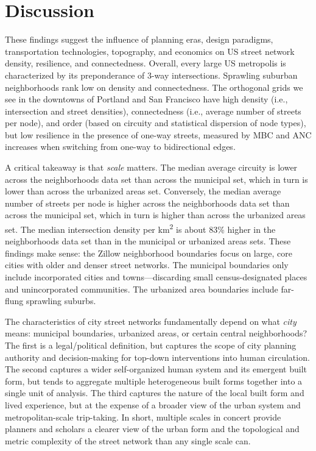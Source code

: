 \documentclass[Afour,sageh,times]{sagej}
\begin{document}
\section{Discussion}

These findings suggest the influence of planning eras, design paradigms, transportation technologies, topography, and economics on US street network density, resilience, and connectedness. Overall, every large US metropolis is characterized by its preponderance of 3-way intersections. Sprawling suburban neighborhoods rank low on density and connectedness. The orthogonal grids we see in the downtowns of Portland and San Francisco have high density (i.e., intersection and street densities), connectedness (i.e., average number of streets per node), and order (based on circuity and statistical dispersion of node types), but low resilience in the presence of one-way streets, measured by MBC and ANC increases when switching from one-way to bidirectional edges.

A critical takeaway is that \emph{scale} matters. The median average circuity is lower across the neighborhoods data set than across the municipal set, which in turn is lower than across the urbanized areas set. Conversely, the median average number of streets per node is higher across the neighborhoods data set than across the municipal set, which in turn is higher than across the urbanized areas set. The median intersection density per km\textsuperscript{2} is about 83\% higher in the neighborhoods data set than in the municipal or urbanized areas sets. These findings make sense: the Zillow neighborhood boundaries focus on large, core cities with older and denser street networks. The municipal boundaries only include incorporated cities and towns---discarding small census-designated places and unincorporated communities. The urbanized area boundaries include far-flung sprawling suburbs.

The characteristics of city street networks fundamentally depend on what \emph{city} means: municipal boundaries, urbanized areas, or certain central neighborhoods? The first is a legal/political definition, but captures the scope of city planning authority and decision-making for top-down interventions into human circulation. The second captures a wider self-organized human system and its emergent built form, but tends to aggregate multiple heterogeneous built forms together into a single unit of analysis. The third captures the nature of the local built form and lived experience, but at the expense of a broader view of the urban system and metropolitan-scale trip-taking. In short, multiple scales in concert provide planners and scholars a clearer view of the urban form and the topological and metric complexity of the street network than any single scale can.
\end{document}
